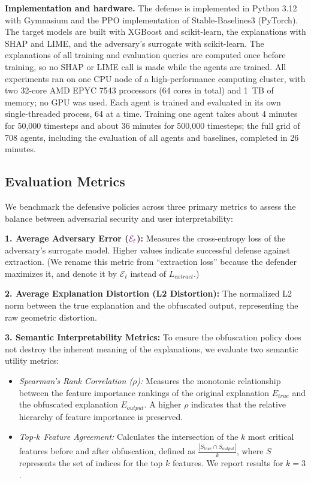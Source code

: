 \documentclass[conference]{IEEEtran}
\DeclareRobustCommand{\rev}[1]{{\color{blue}#1}}
\DeclareRobustCommand{\revnew}[1]{{\color{revpurple}#1}}
\begin{document}
\revnew{\textbf{Implementation and hardware.} The defense is implemented in Python 3.12 with Gymnasium and the PPO implementation of Stable-Baselines3 (PyTorch). The target models are built with XGBoost and scikit-learn, the explanations with SHAP and LIME, and the adversary's surrogate with scikit-learn. The explanations of all training and evaluation queries are computed once before training, so no SHAP or LIME call is made while the agents are trained. All experiments ran on one CPU node of a high-performance computing cluster, with two 32-core AMD EPYC 7543 processors (64 cores in total) and 1~TB of memory; no GPU was used. Each agent is trained and evaluated in its own single-threaded process, 64 at a time. Training one agent takes about 4 minutes for 50,000 timesteps and about 36 minutes for 500,000 timesteps; the full grid of 708 agents, including the evaluation of all agents and baselines, completed in 26 minutes.}

\subsection{Evaluation Metrics}
\label{sec:metrics}
We benchmark the defensive policies across three primary metrics to assess the balance between adversarial security and user interpretability:

\textbf{1. Average \rev{Adversary Error} ($\revnew{\mathcal{E}_t}$):} Measures the cross-entropy loss of the adversary's surrogate model. Higher values indicate successful defense against extraction. \rev{(We rename this metric from ``extraction loss'' because the defender maximizes it\revnew{, and denote it by $\mathcal{E}_t$ instead of $L_{extract}$}.)}

\textbf{2. Average \rev{Explanation Distortion} (L2 Distortion):} The normalized L2 norm between the true explanation and the obfuscated output, representing the raw geometric distortion.

\textbf{3. Semantic Interpretability Metrics:} To ensure the obfuscation policy does not destroy the inherent meaning of the explanations, we evaluate two semantic utility metrics:
\begin{itemize}
    \item \textit{Spearman's Rank Correlation ($\rho$):} Measures the monotonic relationship between the feature importance rankings of the original explanation $E_{true}$ and the obfuscated explanation $E_{output}$. A higher $\rho$ indicates that the relative hierarchy of feature importance is preserved.
    \item \textit{Top-$k$ Feature Agreement:} Calculates the intersection of the $k$ most critical features before and after obfuscation, defined as $\frac{|S_{true} \cap S_{output}|}{k}$, where $S$ represents the set of indices for the top $k$ features. We report results for $k=3$.
\end{itemize}
\end{document}
